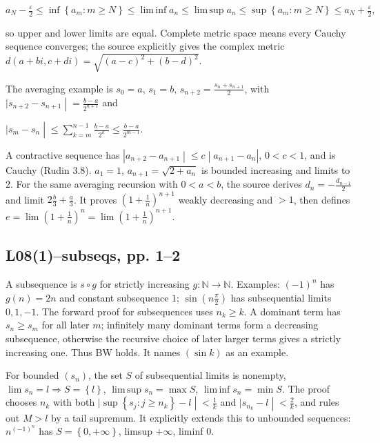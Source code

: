 \(a_{N} - \frac{\varepsilon}{2} \leq \inf\left\{ {a_{m}:m \geq N} \right\} \leq \operatorname{lim\, inf}a_{n} \leq \operatorname{lim\, sup}a_{n} \leq \sup\left\{ {a_{m}:m \geq N} \right\} \leq a_{N} + \frac{\varepsilon}{2},\)

so upper and lower limits are equal. Complete metric space means every Cauchy sequence converges; the source explicitly gives the complex metric \(d\left( {a + bi,c + di} \right) = \sqrt{\left( {a - c} \right)^{2} + \left( {b - d} \right)^{2}}\).

The averaging example is \(s_{0} = a\), \(s_{1} = b\), \(s_{n + 2} = \frac{s_{n} + s_{n + 1}}{2}\), with \(\left. |s_{n + 2} - s_{n + 1} \middle| = \frac{b - a}{2^{n + 1}} \right.\) and

\(\left. |s_{m} - s_{n} \middle| \leq \sum_{k = m}^{n - 1}\frac{b - a}{2^{k}} \leq \frac{b - a}{2^{m - 1}}. \right.\)

A contractive sequence has \(\left. |a_{n + 2} - a_{n + 1} \middle| \leq c \middle| a_{n + 1} - a_{n}| \right.\), \(0 < c < 1\), and is Cauchy (Rudin 3.8). \(a_{1} = 1\), \(a_{n + 1} = \sqrt{2 + a_{n}}\) is bounded increasing and limits to \(2\). For the same averaging recursion with \(0 < a < b\), the source derives \(d_{n} = - \frac{d_{n - 1}}{2}\) and limit \(2\frac{b}{3} + \frac{a}{3}\). It proves \(\left( {1 + \frac{1}{n}} \right)^{n + 1}\) weakly decreasing and \(> 1\), then defines \(e = {\lim\left( {1 + \frac{1}{n}} \right)}^{n} = {\lim\left( {1 + \frac{1}{n}} \right)}^{n + 1}\).

\subsection{L08(1)--subseqs, pp. 1--2}

A subsequence is \(s \circ g\) for strictly increasing \(g:\mathbb{N}\rightarrow\mathbb{N}\). Examples: \(\left( {- 1} \right)^{n}\) has \(g(n) = 2n\) and constant subsequence \(1\); \(\sin\left( {n\frac{\pi}{2}} \right)\) has subsequential limits \(0,1, - 1\). The forward proof for subsequences uses \(n_{k} \geq k\). A dominant term has \(s_{n} \geq s_{m}\) for all later \(m\); infinitely many dominant terms form a decreasing subsequence, otherwise the recursive choice of later larger terms gives a strictly increasing one. Thus BW holds. It names \(\left( {\sin k} \right)\) as an example.

For bounded \(\left( s_{n} \right)\), the set \(S\) of subsequential limits is nonempty, \(\lim s_{n} = l\Rightarrow S = \left\{ l \right\}\), \(\operatorname{lim\, sup}s_{n} = \max S\), \(\operatorname{lim\, inf}s_{n} = \min S\). The proof chooses \(n_{k}\) with both \(\left. |\sup\left\{ {s_{j}:j \geq n_{k}} \right\} - l \middle| < \frac{1}{k} \right.\) and \(\left. |s_{n_{k}} - l \middle| < \frac{2}{k} \right.\), and rules out \(M > l\) by a tail supremum. It explicitly extends this to unbounded sequences: \(n^{{({- 1})}^{n}}\) has \(S = \left\{ {0, + \infty} \right\}\), limsup \(+ \infty\), liminf \(0\).

